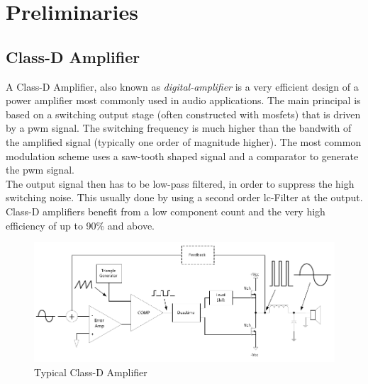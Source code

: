 \chapter{Preliminaries}
\section{Class-D Amplifier}
A Class-D Amplifier, also known as \textit{digital-amplifier} is a very efficient design of a power amplifier most commonly used in audio applications. The main principal is based on a switching output stage (often constructed with \acrshort{mosfet}s) that is driven by a \acrfull{pwm} signal. The switching frequency is much higher than the bandwith of the amplified signal (typically one order of magnitude higher). The most common modulation scheme uses a saw-tooth shaped signal and a comparator to generate the \acrshort{pwm} signal.\\
The output signal then has to be low-pass filtered, in order to suppress the high switching noise. This usually done by using a second order \acrshort{lc}-Filter at the output. Class-D amplifiers benefit from a low component count and the very high efficiency of up to 90\% and above.

\begin{figure}[h!]
	\centering
	\includegraphics[width=\textwidth]{images/2_Preliminaries/Class-D Amplifier.pdf}
	\vspace{-0.2cm}
    \caption{Typical Class-D Amplifier \cite{analog_class_d_Basics}}
    \label{fig:class_d_amplifier}
\end{figure}
\newpage


